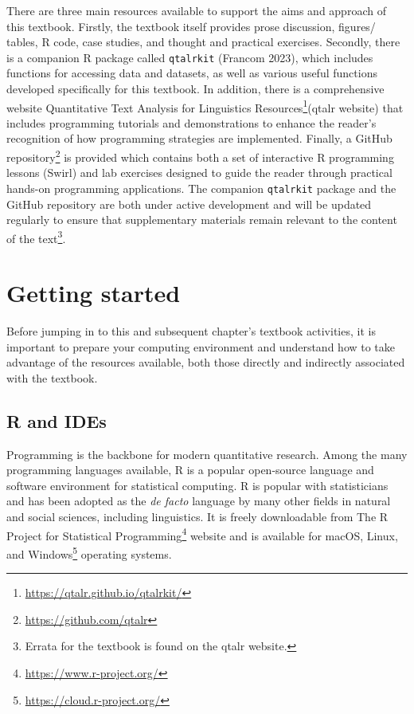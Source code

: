\documentclass[
  letterpaper,
]{latex/krantz}
\DeclareRobustCommand{\href}[2]{#2\footnote{\url{#1}}}
\begin{document}
There are three main resources available to support the aims and
approach of this textbook. Firstly, the textbook itself provides prose
discussion, figures/ tables, R code, case studies, and thought and
practical exercises. Secondly, there is a companion R package called
\texttt{qtalrkit} (Francom 2023), which includes functions for accessing
data and datasets, as well as various useful functions developed
specifically for this textbook. In addition, there is a comprehensive
website \href{https://qtalr.github.io/qtalrkit/}{Quantitative Text
Analysis for Linguistics Resources}(qtalr website) that includes
programming tutorials and demonstrations to enhance the reader's
recognition of how programming strategies are implemented. Finally, a
\href{https://github.com/qtalr}{GitHub repository} is provided which
contains both a set of interactive R programming lessons (Swirl) and lab
exercises designed to guide the reader through practical hands-on
programming applications. The companion \texttt{qtalrkit} package and
the GitHub repository are both under active development and will be
updated regularly to ensure that supplementary materials remain relevant
to the content of the text\footnote{Errata for the textbook is found on
  the qtalr website.}.

\hypertarget{sec-getting-started}{%
\section*{Getting started}\label{sec-getting-started}}


Before jumping in to this and subsequent chapter's textbook activities,
it is important to prepare your computing environment and understand how
to take advantage of the resources available, both those directly and
indirectly associated with the textbook.

\hypertarget{r-and-ides}{%
\subsection*{R and IDEs}\label{r-and-ides}}

Programming is the backbone for modern quantitative research. Among the
many programming languages available, R is a popular open-source
language and software environment for statistical computing. R is
popular with statisticians and has been adopted as the \emph{de facto}
language by many other fields in natural and social sciences, including
linguistics. It is freely downloadable from
\href{https://www.r-project.org/}{The R Project for Statistical
Programming} website and is available for
\href{https://cloud.r-project.org/}{macOS, Linux, and Windows} operating
systems.
\end{document}
